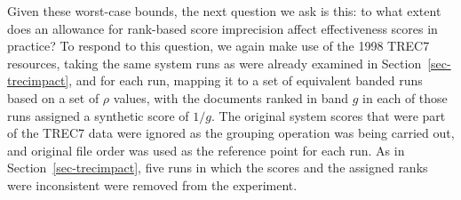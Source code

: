 
Given these worst-case bounds, the next question we ask is this: to
what extent does an allowance for rank-based score imprecision affect
effectiveness scores in practice?
To respond to this question, we again make use of the 1998 TREC7
resources, taking the same system runs as were already examined in
Section~\ref{sec-trecimpact}, and for each run, mapping it to a set
of equivalent banded runs based on a set of $\rho$ values, with the
documents ranked in band $g$ in each of those runs assigned a
synthetic score of $1/g$.
The original system scores that were part of the TREC7 data were
ignored as the grouping operation was being carried out, and original
file order was used as the reference point for each run.
As in Section~\ref{sec-trecimpact}, five runs in which the scores and
the assigned ranks were inconsistent were removed from the
experiment.

